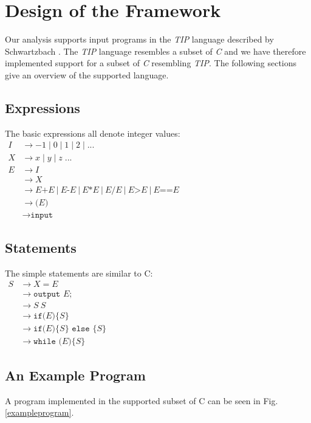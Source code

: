\section{Design of the Framework}

\newpar Our analysis supports input programs in the \textit{TIP} language described by Schwartzbach \cite{spa}. The \textit{TIP} language resembles a subset of \textit{C} and we have therefore implemented support for a subset of \textit{C} resembling \textit{TIP}. The following sections give an overview of the supported language.

\subsection{Expressions}
The basic expressions all denote integer values: \\

$
\begin{aligned}
    I & \rightarrow -1\;|\;0\;|\;1\;|\;2\;|\;... \\
    X & \rightarrow x\;|\;y\;|\;z\;... \\
    E & \rightarrow { I } \\
    & \rightarrow { X } \\ 
    & \rightarrow E\texttt{+}E\:|\:E\texttt{-}E\:|\:E \texttt{*} E\:|\:E \texttt{/} E\:|\:E\texttt{>}E\:|\:E\texttt{==}E \\ 
    & \rightarrow\texttt{(}E\texttt{)} \\
    & \rightarrow\texttt{input} 
\end{aligned}
$


\subsection{Statements}
The simple statements are similar to C: \\

$
\begin{aligned} S & \rightarrow X = E \\
& \rightarrow \texttt {output } E ; \\ 
& \rightarrow S\:S \\ 
& \rightarrow \texttt{if(}E\texttt{)}\{S\} \\ 
& \rightarrow \texttt{if(} E \texttt{)}\{S\} \texttt { else }\{S\} \\ 
& \rightarrow \texttt {while (}E\texttt{)}\{ S\}
\end{aligned}
$

\subsection{An Example Program}
A program implemented in the supported subset of C can be seen in Fig. \ref{exampleprogram}.

